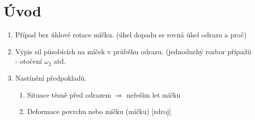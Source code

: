 \chapter*{Úvod}

\begin{enumerate}
 \item Případ bez úhlové rotace míčku. (úhel dopadu se rovná úhel odrazu a proč)
 \item Výpis sil působících na míček v průběhu odrazu. (jednoduchý rozbor
  případů - otočení $\omega_2$ atd.
 \item Nastínění předpokladů.
 \begin{enumerate}
  \item Situace těsně před odrazem $ \Rightarrow $ neřeším let míčku
  \item Deformace povrchu nebo míčku (míčku) [zdroj]
 \end{enumerate}
\end{enumerate}
